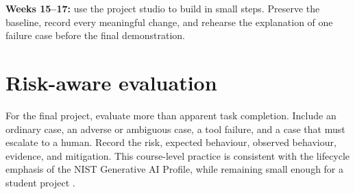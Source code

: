\begin{labbox}
\textbf{Weeks 15--17:} use the project studio to build in small steps. Preserve the baseline, record every meaningful change, and rehearse the explanation of one failure case before the final demonstration.
\end{labbox}

\section{Risk-aware evaluation}
For the final project, evaluate more than apparent task completion. Include an ordinary case, an adverse or ambiguous case, a tool failure, and a case that must escalate to a human. Record the risk, expected behaviour, observed behaviour, evidence, and mitigation. This course-level practice is consistent with the lifecycle emphasis of the NIST Generative AI Profile, while remaining small enough for a student project \citep{nistgenai2024}.
